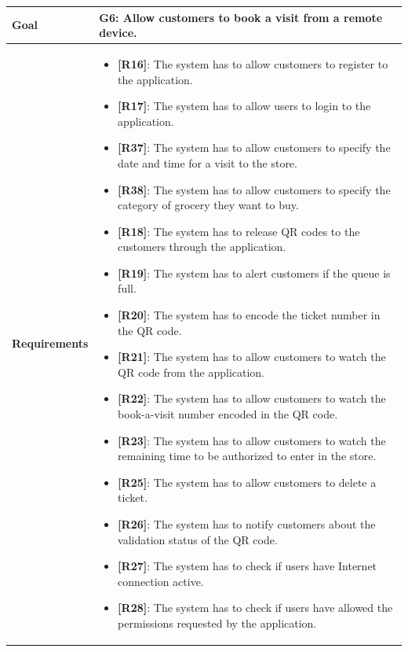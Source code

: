 \begin{table}[H]
    \centering
    \begin{tabular}{| m{} | m{} |}
        \hline
        \textbf{Goal} &
        \textbf{G6: Allow customers to book a visit from a remote device.} \\
        \hline
        \textbf{Requirements} &
        \begin{itemize}
            \item {\textbf{[R16]}}: The system has to allow customers to register to the application.
            \item {\textbf{[R17]}}: The system has to allow users to login to the application.
            \item {\textbf{[R37]}}: The system has to allow customers to specify the date and time for a visit to the store.
            \item {\textbf{[R38]}}: The system has to allow customers to specify the category of grocery they want to buy.
            \item {\textbf{[R18]}}: The system has to release QR codes to the customers through the application.
            \item {\textbf{[R19]}}: The system has to alert customers if the queue is full.
            \item {\textbf{[R20]}}: The system has to encode the ticket number in the QR code.
            \item {\textbf{[R21]}}: The system has to allow customers to watch the QR code from the application.
            \item {\textbf{[R22]}}: The system has to allow customers to watch the book-a-visit number encoded in the QR code.
            \item {\textbf{[R23]}}: The system has to allow customers to watch the remaining time to be authorized to enter in the store.
            \item {\textbf{[R25]}}: The system has to allow customers to delete a ticket.
            \item {\textbf{[R26]}}: The system has to notify customers about the validation status of the QR code.
            \item {\textbf{[R27]}}: The system has to check if users have Internet connection active.
            \item {\textbf{[R28]}}: The system has to check if users have allowed the permissions requested by the application.

\end{itemize}
\end{tabular}
\end{table}

